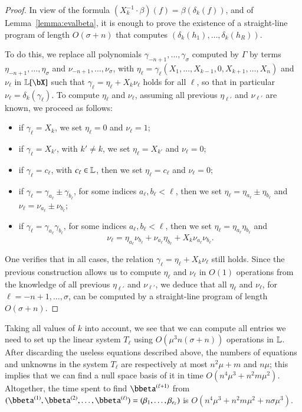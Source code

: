 \documentclass[amsthm]{elsart}
\begin{document}
\begin{proof}
  In view of the formula $(X_k^{-1} \cdot
  \beta)(f)=\beta(\delta_k(f))$, and of Lemma~\ref{lemma:evalbeta}, it is
  enough to prove the existence of a straight-line program of length
  $O(\sigma+n)$ that computes $(\delta_k(h_1),\dots,\delta_k(h_R))$.

  To do this, we replace all polynomials
  $\gamma_{-n+1},\dots,\gamma_\sigma$ computed by $\Gamma$ by terms
  $\eta_{-n+1},\dots,\eta_\sigma$ and $\nu_{-n+1},\dots,\nu_\sigma$,
  with
  $\eta_\ell=\gamma_\ell(X_1,\dots,X_{k-1},0,X_{k+1},\dots,X_n)$
  and $\nu_\ell$ in $\LL[\bX]$ such that
  $\gamma_\ell= \eta_\ell+X_k \nu_\ell$ holds for all $\ell$, so
  that in particular $\nu_\ell=\delta_k(\gamma_\ell)$.  To compute
  $\eta_\ell$ and $\nu_\ell$, assuming all previous
  $\eta_{\ell'}$ and $\nu_{\ell'}$ are known, we proceed as
  follows:
  \begin{itemize}
  \item if $\gamma_\ell=X_k$, we set $\eta_\ell=0$ and $\nu_\ell=1$;
  \item if $\gamma_\ell=X_{k'}$, with $k' \ne k$, we set $\eta_\ell=X_{k'}$ and $\nu_\ell=0$;
  \item if $\gamma_\ell =c_\ell$, with $c_\ell \in \mathbb{L}$,
    then we set $\eta_\ell=c_\ell$ and  $\nu_\ell=0$;
  \item if $\gamma_\ell = \gamma_{a_\ell} \pm \gamma_{b_\ell}$,
    for some indices $a_\ell,b_\ell < \ell$, 
    then we set $\eta_\ell=\eta_{a_\ell}\pm\eta_{b_\ell}$
    and $\nu_\ell=\nu_{a_\ell}\pm\nu_{b_\ell}$;
\item if $\gamma_\ell = \gamma_{a_\ell} \gamma_{b_\ell}$,
      for some indices $a_\ell,b_\ell < \ell$,
    then we set $\eta_\ell=\eta_{a_\ell} \eta_{b_\ell}$
    and $$\nu_\ell=
\eta_{a_\ell} \nu_{b_\ell}
+
\nu_{a_\ell} \eta_{b_\ell}
+
X_k\nu_{a_\ell} \nu_{b_\ell}.$$
\end{itemize}
One verifies that in all cases, the relation $\gamma_\ell=
\eta_\ell+X_k \nu_\ell$ still holds. Since the previous
construction allows us to compute $\eta_\ell$ and $\nu_\ell$ in
$O(1)$ operations from the knowledge of all previous $\eta_{\ell'}$
and $\nu_{\ell'}$, we deduce that all $\eta_\ell$ and $\nu_\ell$,
for $\ell=-n+1,\dots,\sigma$, can be computed by a straight-line program of
length $O(\sigma+n)$.
\end{proof}

Taking all values of $k$ into account, we see that we can compute all
entries we need to set up the linear system $T_\ell$ using $O(\mu^3
n(\sigma+n))$ operations in $\mathbb{L}$. After discarding the useless equations
described above, the numbers of equations and unknowns in the system
$T_\ell$ are respectively at most $n^2 \mu+m$ and $n \mu$; this
implies that we can find a null space basis of it in time $O(n^4 \mu^3
+ n^2 m \mu^2)$. Altogether, the time spent to find
$\bbeta^{(\ell+1)}$ from
$(\bbeta^{(1)},\bbeta^{(2)},\dots,\bbeta^{(\ell)})=(\beta_{1},\dots,\beta_{e_\ell})$
is $O(n^4 \mu^3 + n^2 m \mu^2 + n \sigma \mu^3)$.
\end{document}
